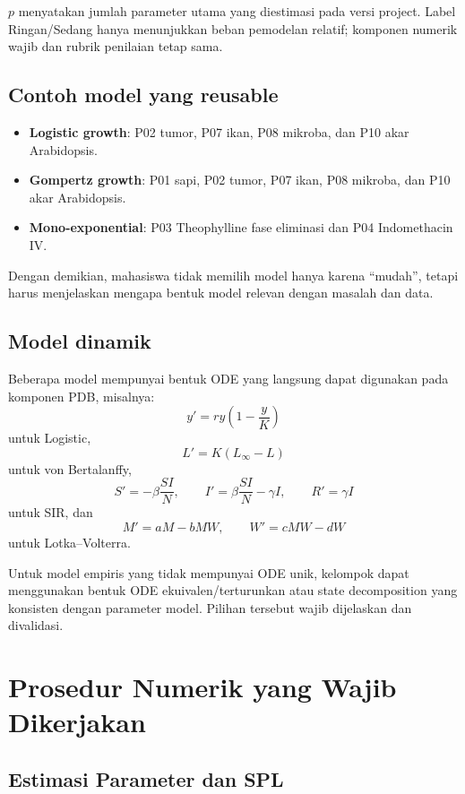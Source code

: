 \documentclass[11pt,a4paper]{article}
\begin{document}
$p$ menyatakan jumlah parameter utama yang diestimasi pada versi project. Label Ringan/Sedang hanya menunjukkan beban pemodelan relatif; komponen numerik wajib dan rubrik penilaian tetap sama.

\subsection{Contoh model yang reusable}

\begin{itemize}
    \item \textbf{Logistic growth}: P02 tumor, P07 ikan, P08 mikroba, dan P10 akar Arabidopsis.
    \item \textbf{Gompertz growth}: P01 sapi, P02 tumor, P07 ikan, P08 mikroba, dan P10 akar Arabidopsis.
    \item \textbf{Mono-exponential}: P03 Theophylline fase eliminasi dan P04 Indomethacin IV.
\end{itemize}

Dengan demikian, mahasiswa tidak memilih model hanya karena ``mudah'', tetapi harus menjelaskan mengapa bentuk model relevan dengan masalah dan data.

\subsection{Model dinamik}

Beberapa model mempunyai bentuk ODE yang langsung dapat digunakan pada komponen PDB, misalnya:
\[
y'=ry\left(1-\frac{y}{K}\right)
\]
untuk Logistic,
\[
L'=K(L_\infty-L)
\]
untuk von Bertalanffy,
\[
S'=-\beta\frac{SI}{N},\qquad I'=\beta\frac{SI}{N}-\gamma I,\qquad R'=\gamma I
\]
untuk SIR, dan
\[
M'=aM-bMW,\qquad W'=cMW-dW
\]
untuk Lotka--Volterra.

Untuk model empiris yang tidak mempunyai ODE unik, kelompok dapat menggunakan bentuk ODE ekuivalen/terturunkan atau state decomposition yang konsisten dengan parameter model. Pilihan tersebut wajib dijelaskan dan divalidasi.

\section{Prosedur Numerik yang Wajib Dikerjakan}

\subsection{Estimasi Parameter dan SPL}
\end{document}
